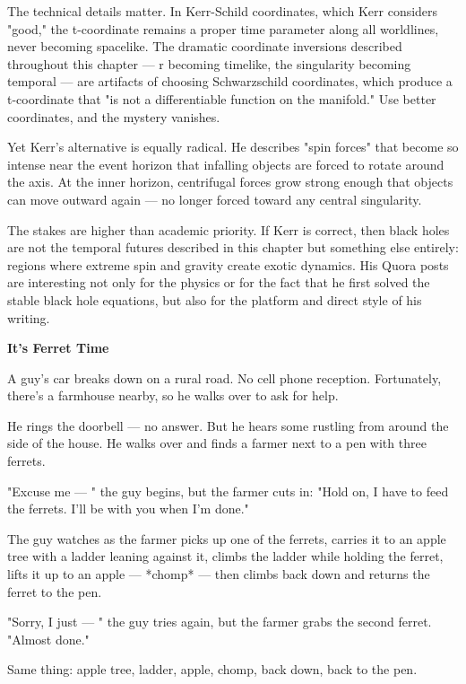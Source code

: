 \begin{commentary}
The technical details matter. In Kerr-Schild coordinates, which Kerr considers "good," the t-coordinate remains a proper time parameter along all worldlines, never becoming spacelike. The dramatic coordinate inversions described throughout this chapter — r becoming timelike, the singularity becoming temporal — are artifacts of choosing Schwarzschild coordinates, which produce a t-coordinate that "is not a differentiable function on the manifold." Use better coordinates, and the mystery vanishes.

Yet Kerr's alternative is equally radical. He describes "spin forces" that become so intense near the event horizon that infalling objects are forced to rotate around the axis. At the inner horizon, centrifugal forces grow strong enough that objects can move outward again — no longer forced toward any central singularity.

The stakes are higher than academic priority. If Kerr is correct, then black holes are not the temporal futures described in this chapter but something else entirely: regions where extreme spin and gravity create exotic dynamics. His Quora posts are interesting not only for the physics or for the fact that he first solved the stable black hole equations, but also for the platform and direct style of his writing.
\end{commentary}

\medskip

\noindent\textbf{It's Ferret Time}

A guy's car breaks down on a rural road. No cell phone reception. Fortunately, there's a farmhouse nearby, so he walks over to ask for help.

He rings the doorbell — no answer. But he hears some rustling from around the side of the house. He walks over and finds a farmer next to a pen with three ferrets.

"Excuse me — " the guy begins, but the farmer cuts in: "Hold on, I have to feed the ferrets. I'll be with you when I'm done."

The guy watches as the farmer picks up one of the ferrets, carries it to an apple tree with a ladder leaning against it, climbs the ladder while holding the ferret, lifts it up to an apple — *chomp* — then climbs back down and returns the ferret to the pen.

"Sorry, I just — " the guy tries again, but the farmer grabs the second ferret. "Almost done."

Same thing: apple tree, ladder, apple, chomp, back down, back to the pen.

